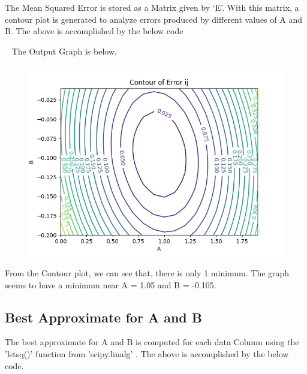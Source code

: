 \documentclass[12pt, a4paper]{report}
\begin{document}
 The Mean Squared Error is stored as a Matrix given by ‘E’. With this matrix, a contour plot is generated to analyze errors produced by different values of A and B. The above is accomplished by the below code
\vspace{4mm}
\noindent

 \ 
 \break
\noindent
The Output Graph is below,
\begin{figure}[h!]
    \centering
    \includegraphics[scale=0.62150]{ContourPlot.png} 
    \caption{}
    \label{fig:my_label}
\end{figure}
\vspace{1mm}


 From the Contour plot, we can see that, there is only 1 minimum. The graph seems to have a minimum near A = 1.05 and B = -0.105.

\subsection{Best Approximate for A and B}
The best approximate for A and B is computed for each data Column using the {\selectfont
'lstsq()'
} function from {\selectfont
'scipy.linalg'
}. The above is accomplished by the below code.
 
\vspace{5mm} %
\noindent

\end{document}
